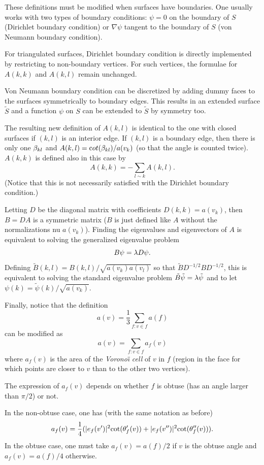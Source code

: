 \documentclass{InsightArticle}
\begin{document}
These definitions must be modified when surfaces have
boundaries. One usually works with two types of boundary conditions:
$\psi  = 0$ on the boundary of $S$ (Dirichlet boundary condition) or
$\nabla \psi$ tangent to the boundary of $S$ (von Neumann boundary
condition). 

For triangulated surfaces, Dirichlet boundary condition is directly
implemented by restricting to non-boundary vertices. For such
vertices, the formulae for $A(k,k)$ and $A(k,l)$ remain unchanged.

Von Neumann boundary condition can be discretized by adding dummy
faces  to the surfaces symmetrically to boundary edges. This results
in an extended surface $\tilde S$ and a function $\psi$ on $S$ can be
extended to $\tilde S$ by symmetry too. 

The resulting new definition of $A(k,l)$ is identical to the one with
closed surfaces if $(k,l)$ is an interior edge. If $(k,l)$ is a
boundary edge, then there is only one $\beta_{kl}$ and $A(k,l) = 
{\mathrm cot}(\beta_{kl}) /a(v_k)$ (so that the angle is counted twice). $A(k,k)$ is defined also in this
case by
\[
A(k,k) = - \sum_{l \sim k}  A(k,l).
\]
(Notice that this is not necessarily satisfied with the
Dirichlet boundary condition.)

\bigskip

Letting $D$ be the diagonal matrix with coefficients $D(k,k) = a(v_k)$,
then $B = DA$  is a symmetric matrix ($B$ is just defined like $A$
without the normalizations nu $a(v_k)$). Finding the eigenvalues and
eigenvectors of $A$ is equivalent to solving the generalized
eigenvalue problem
\[
B\psi = \lambda D\psi.
\]
Defining $\tilde B(k,l) = B(k,l)/\sqrt{a(v_k) a(v_l)} $ so that
$\tilde B D^{-1/2} B D^{-1/2}$, this is
equivalent to solving the standard eigenvalue problem $\tilde B \tilde
\psi = \lambda \tilde \psi$ and to let $\psi(k) = \tilde\psi(k)
/\sqrt{a(v_k)}$. 

Finally, notice that the definition
\[
a(v) = \frac13 \sum_{f:v\in f} a(f)
\]
can be modified as
\[
a(v) = \sum_{f:v\in f} a_f(v)
\]
where $a_f(v)$ is the area of the {\em Vorono\"\i<F9>} {\em cell} of $v$ in
$f$ (region in the face for which points are closer to $v$ than to
the other two vertices).

The expression of $a_f(v)$ depends on whether $f$ is obtuse (has an
angle larger than $\pi/2$) or not.

In the non-obtuse case, one has (with the same notation as before)
\[
a_f(v) = \frac14 (|e_f(v')|^2 \mathrm{cot}(\theta'_f(v)) + |e_f(v'')|^2
\mathrm{cot}(\theta''_f(v))).
\] 
In the obtuse case, one must take
$a_f(v) = a(f)/2$ if $v$ is the obtuse angle and $a_f(v) = a(f)/4$ otherwise.
\end{document}
